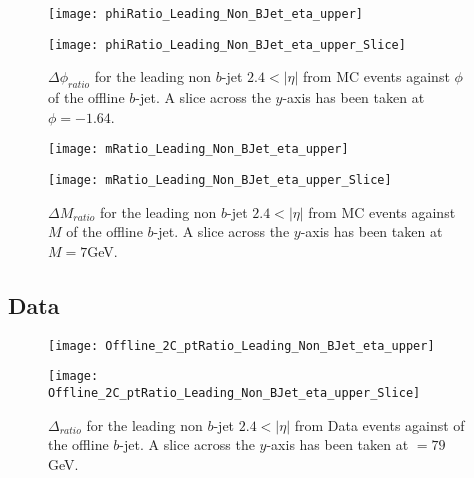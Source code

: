 		\begin{figure}[h]
			\centering

			\begin{minipage}[h]{0.33\linewidth}
				\texttt{[image: phiRatio\_Leading\_Non\_BJet\_eta\_upper]}
			\end{minipage}
			\quad
			\begin{minipage}[h]{0.33\linewidth}
				\texttt{[image: phiRatio\_Leading\_Non\_BJet\_eta\_upper\_Slice]}
			\end{minipage}
			\caption{$\Delta \phi_{ratio}$ for the leading \pt non $b$-jet $2.4 < |\eta|$ from MC events against $\phi$ of the offline $b$-jet. A slice across the $y$-axis has been taken at $\phi=-1.64$. }
			\label{fig:MC:leadingnonbphiforward}
		\end{figure}

		\begin{figure}[h]
			\centering

			\begin{minipage}[h]{0.33\linewidth}
				\texttt{[image: mRatio\_Leading\_Non\_BJet\_eta\_upper]}
			\end{minipage}
			\quad
			\begin{minipage}[h]{0.33\linewidth}
				\texttt{[image: mRatio\_Leading\_Non\_BJet\_eta\_upper\_Slice]}
			\end{minipage}
			\caption{$\Delta M_{ratio}$ for the leading \pt non $b$-jet $2.4 < |\eta|$ from MC events against $M$ of the offline $b$-jet. A slice across the $y$-axis has been taken at $M=7$GeV. }
			\label{fig:MC:leadingnonbmforward}
		\end{figure}
		
		\newpage
		\subsection{Data}
		
		\begin{figure}[h]
			\centering
			\begin{minipage}[h]{0.33\linewidth}
				\texttt{[image: Offline\_2C\_ptRatio\_Leading\_Non\_BJet\_eta\_upper]}
				
			\end{minipage}
			\quad
			\begin{minipage}[h]{0.33\linewidth}
				\texttt{[image: Offline\_2C\_ptRatio\_Leading\_Non\_BJet\_eta\_upper\_Slice]}
			\end{minipage}
			\caption{$\Delta $\pt$_{ratio}$ for the leading \pt non $b$-jet $2.4 < |\eta|$ from Data events against \pt of the offline $b$-jet. A slice across the $y$-axis has been taken at \pt$=79$GeV. }
			\label{fig:D:leadingnonbptforward}
		\end{figure}
		
